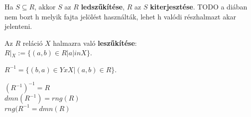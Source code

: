 \begin{frame}
\begin{tcolorbox}[title={Def.: Leszűkítés, kierjesztés}]
Ha $S \subseteq R$, akkor $S$ az $R$ \textbf{ledszűkítése}, $R$ az $S$ \textbf{kiterjesztése}.
TODO a diában nem bozt h melyik fajta jelölést használták, lehet h valódi részhalmazt akar jelenteni.
\end{tcolorbox}

\begin{tcolorbox}[title={Def.: Az $R$ reláció $X$ halmazra való Leszűkítése}]
Az $R$ reláció $X$ halmazra való \textbf{leszűkítése}:\\
$R|_X := \{(a, b) \in R | a |in X \}$.
\end{tcolorbox}

\begin{tcolorbox}[title={Def.: Ar $r \subset X x Y$ reláció inverze}]
$R^{-1} = \{(b, a) \in Y x X | (a, b) \in R \}$.
\end{tcolorbox}

\begin{tcolorbox}[title={Ész}]
$(R^{-1})^{-1} = R$\\
$dmn(R^{-1}) = rng(R)$\\
$rng(R^{-1} = dmn(R)$\\
\end{tcolorbox}
\end{frame}

